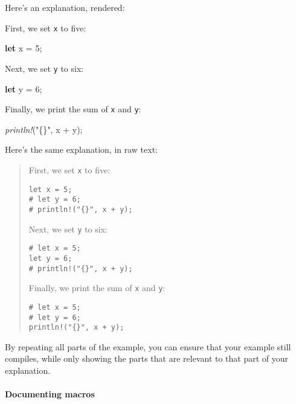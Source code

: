 \documentclass[a4paper,]{book}
\newenvironment{Shaded}{\begin{snugshade}}{\end{snugshade}}
\newcommand{\KeywordTok}[1]{\textcolor[rgb]{0.13,0.29,0.53}{\textbf{{#1}}}}
\newcommand{\DecValTok}[1]{\textcolor[rgb]{0.00,0.00,0.81}{{#1}}}
\newcommand{\StringTok}[1]{\textcolor[rgb]{0.31,0.60,0.02}{{#1}}}
\newcommand{\PreprocessorTok}[1]{\textcolor[rgb]{0.56,0.35,0.01}{\textit{{#1}}}}
\newcommand{\NormalTok}[1]{{#1}}
\let\oldparagraph\paragraph
\renewcommand{\paragraph}[1]{\oldparagraph{#1}\mbox{}}
\begin{document}
Here's an explanation, rendered:

First, we set \texttt{x} to five:

\begin{Shaded}
\begin{Highlighting}[]
\KeywordTok{let} \NormalTok{x = }\DecValTok{5}\NormalTok{;}
\end{Highlighting}
\end{Shaded}

Next, we set \texttt{y} to six:

\begin{Shaded}
\begin{Highlighting}[]
\KeywordTok{let} \NormalTok{y = }\DecValTok{6}\NormalTok{;}
\end{Highlighting}
\end{Shaded}

Finally, we print the sum of \texttt{x} and \texttt{y}:

\begin{Shaded}
\begin{Highlighting}[]
\PreprocessorTok{println!}\NormalTok{(}\StringTok{"\{\}"}\NormalTok{, x + y);}
\end{Highlighting}
\end{Shaded}

Here's the same explanation, in raw text:

\begin{quote}
First, we set \texttt{x} to five:

\begin{verbatim}
let x = 5;
# let y = 6;
# println!("{}", x + y);
\end{verbatim}

Next, we set \texttt{y} to six:

\begin{verbatim}
# let x = 5;
let y = 6;
# println!("{}", x + y);
\end{verbatim}

Finally, we print the sum of \texttt{x} and \texttt{y}:

\begin{verbatim}
# let x = 5;
# let y = 6;
println!("{}", x + y);
\end{verbatim}
\end{quote}

By repeating all parts of the example, you can ensure that your example
still compiles, while only showing the parts that are relevant to that
part of your explanation.

\paragraph{Documenting macros}\label{documenting-macros}
\end{document}
